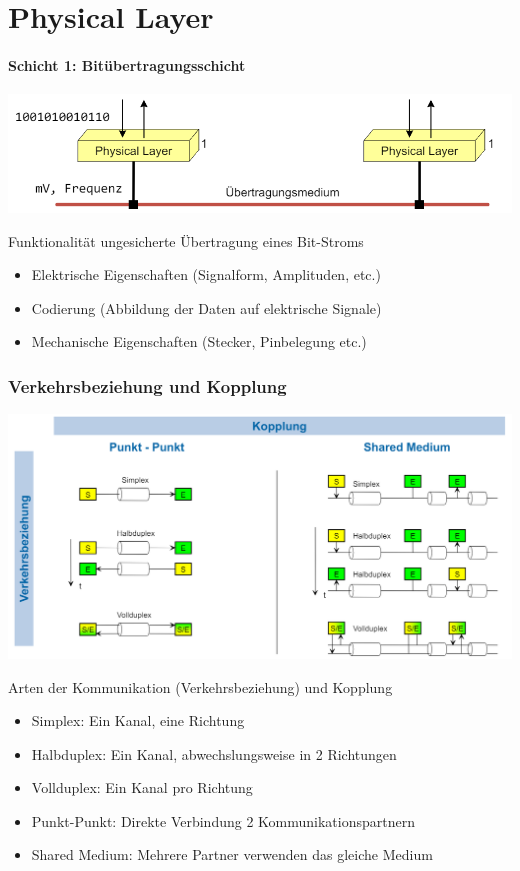 \section{Physical Layer}
\paragraph{Schicht 1: Bitübertragungsschicht}
\includegraphics[width=0.75\linewidth]{images/Physical_Layer.png}

\begin{definition}{Funktionalität}
    ungesicherte Übertragung eines Bit-Stroms
\begin{itemize}
    \item Elektrische Eigenschaften (Signalform, Amplituden, etc.)
    \item Codierung (Abbildung der Daten auf elektrische Signale)
    \item Mechanische Eigenschaften (Stecker, Pinbelegung etc.)
\end{itemize}
\end{definition}

\subsubsection{Verkehrsbeziehung und Kopplung}
\includegraphics[width=1\linewidth]{images/Verkehrsbeziehung_Kopplung.png}

\begin{concept}{Arten der Kommunikation (Verkehrsbeziehung) und Kopplung}
    \begin{itemize}
        \item Simplex: Ein Kanal, eine Richtung
        \item Halbduplex: Ein Kanal, abwechslungsweise in 2 Richtungen
        \item Vollduplex: Ein Kanal pro Richtung
        \item Punkt-Punkt: Direkte Verbindung 2 Kommunikationspartnern
        \item Shared Medium: Mehrere Partner verwenden das gleiche Medium
    \end{itemize}
\end{concept}

